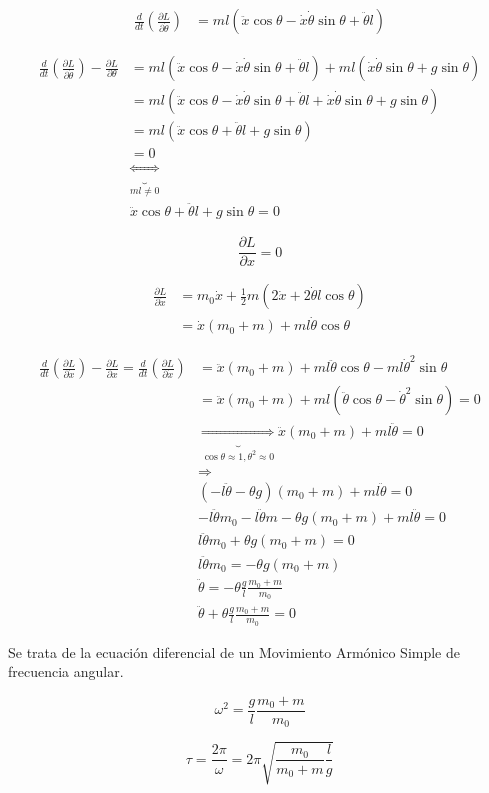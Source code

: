 \documentclass[11pt]{article}
\begin{document}
\begin{align*}
  \frac{d}{dt} (\frac{\partial L}{\partial \dot{\theta}}) &= 
    ml(\ddot{x} \cos \theta - \dot{x} \dot{\theta} \sin \theta  + \ddot{\theta} l)
\end{align*}

\begin{align*}
  \frac{d}{dt} (\frac{\partial L}{\partial \dot{\theta}}) - \frac{\partial L}{\partial \theta} &=
  ml(\ddot{x} \cos \theta - \dot{x} \dot{\theta} \sin \theta  + \ddot{\theta} l)
  + ml( \dot{x} \dot{\theta} \sin \theta + g \sin \theta) \\
  &= ml (\ddot{x} \cos \theta - \dot{x} \dot{\theta} \sin \theta  + \ddot{\theta} l + \dot{x} \dot{\theta} \sin \theta + g \sin \theta) \\
  &= ml (\ddot{x} \cos \theta + \ddot{\theta} l + g \sin \theta) \\
  &= 0 \\
  &\underbrace{\iff}_{ml \neq 0} \\
  &\ddot{x} \cos \theta + \ddot{\theta} l + g \sin \theta = 0
\end{align*}

\begin{equation*}
  \frac{\partial L}{\partial x} = 0
\end{equation*}

\begin{align*}
  \frac{\partial L}{\partial \dot{x}} &= 
    m_0 \dot{x} + \frac{1}{2}m(2\dot{x} + 2\dot{\theta} l \cos \theta) \\
    &= \dot{x} (m_0 + m) + ml\dot{\theta} \cos \theta  
\end{align*}

\begin{align*}
  \frac{d}{dt} (\frac{\partial L}{\partial \dot{x}}) - \frac{\partial L}{\partial x}
  =\frac{d}{dt} (\frac{\partial L}{\partial \dot{x}}) &= 
    \ddot{x}(m_0 + m) + ml\ddot{\theta} \cos \theta - ml \dot{\theta}^2 \sin \theta \\
    &= \ddot{x}(m_0 + m) + ml (\ddot{\theta} \cos \theta - \dot{\theta}^2 \sin \theta) = 0 \\
    &\underbrace{\Rightarrow}_{\cos \theta \approx 1, \theta^2 \approx 0}
    \ddot{x}(m_0 + m) + ml\ddot{\theta} 
    = 0 \\
    &\Rightarrow \\
    &(-l\ddot{\theta} - \theta g)(m_0 + m) +ml\ddot{\theta} = 0 \\
    &-l\ddot{\theta}m_0 - l\ddot{\theta}m - \theta g (m_0 + m) + ml\ddot{\theta} = 0 \\
    &l\ddot{\theta}m_0 + \theta g (m_0 + m) = 0 \\
    &l\ddot{\theta}m_0 = -\theta g (m_0 + m) \\
    &\ddot{\theta} = - \theta \frac{g}{l} \frac{m_0 + m}{m_0} \\
    &\ddot{\theta} + \theta \frac{g}{l} \frac{m_0 + m}{m_0} = 0
\end{align*}

Se trata de la ecuación diferencial de un Movimiento Armónico Simple de frecuencia angular.

\begin{equation*}
  \omega^2 = \frac{g}{l} \frac{m_0 + m}{m_0}
\end{equation*}

\begin{equation*}
  \tau = \frac{2\pi}{\omega} = 2\pi \sqrt{\frac{m_0}{m_0 + m} \frac{l}{g}}
\end{equation*}
\end{document}
